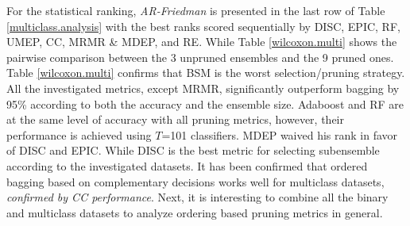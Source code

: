 For the statistical ranking, \textit{AR-Friedman} is presented in the last row of Table \ref{multiclass.analysis} with the best ranks scored sequentially by DISC, EPIC, RF, UMEP, CC, MRMR \& MDEP, and RE. While Table \ref{wilcoxon.multi} shows the pairwise comparison between the 3 unpruned ensembles and the 9 pruned ones. Table  \ref{wilcoxon.multi} confirms that BSM is the worst selection/pruning strategy. All the investigated metrics, except MRMR, significantly outperform bagging by 95\% according to both the accuracy and the ensemble size. Adaboost and RF are at the same level of accuracy with all pruning metrics, however, their performance is achieved using $T$=101 classifiers. MDEP waived his rank in favor of DISC and EPIC. While DISC is the best metric for selecting subensemble according to the investigated datasets. It has been confirmed that ordered bagging based on complementary decisions works well for multiclass datasets, \textit{confirmed by CC performance}. Next, it is interesting to combine all the binary and multiclass datasets to analyze ordering based pruning metrics in general.  


